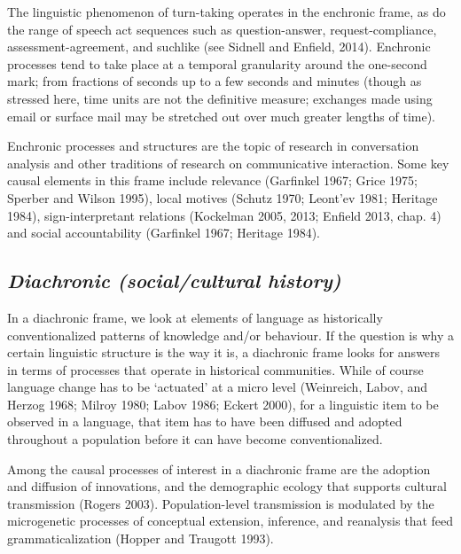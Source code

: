 The linguistic phenomenon of turn-taking operates in the enchronic 
frame, as do the range of speech act sequences such as question-answer, 
request-compliance, assessment-agreement, and suchlike (see Sidnell and 
Enfield, 2014). Enchronic processes tend to take place at a temporal 
granularity around the one-second mark; from fractions of seconds up to 
a few seconds and minutes (though as stressed here, time units are not 
the definitive measure; exchanges made using email or surface mail may 
be stretched out over much greater lengths of time). 



Enchronic processes and structures are the topic of research in 
conversation analysis and other traditions of research on communicative 
interaction. Some key causal elements in this frame include relevance 
(Garfinkel 1967; Grice 1975; Sperber and Wilson 1995), local motives 
(Schutz 1970; Leont'ev 1981; Heritage 1984), sign-interpretant relations 
(Kockelman 2005, 2013; Enfield 2013, chap. 4) and social accountability 
(Garfinkel 1967; Heritage 1984).



\subsection{\textit{Diachronic (social/cultural history)}}



In a diachronic frame, we look at elements of language as historically 
conventionalized patterns of knowledge and/or behaviour. If the question 
is why a certain linguistic structure is the way it is, a diachronic 
frame looks for answers in terms of processes that operate in historical 
communities. While of course language change has to be \textquoteleft actuated' at a 
micro level (Weinreich, Labov, and Herzog 1968; Milroy 1980; Labov 1986; 
Eckert 2000), for a linguistic item to be observed in a language, that 
item has to have been diffused and adopted throughout a population 
before it can have become conventionalized. 



Among the causal processes of interest in a diachronic frame are the 
adoption and diffusion of innovations, and the demographic ecology that 
supports cultural transmission (Rogers 2003). Population-level 
transmission is modulated by the microgenetic processes of conceptual 
extension, inference, and reanalysis that feed grammaticalization 
(Hopper and Traugott 1993). 



